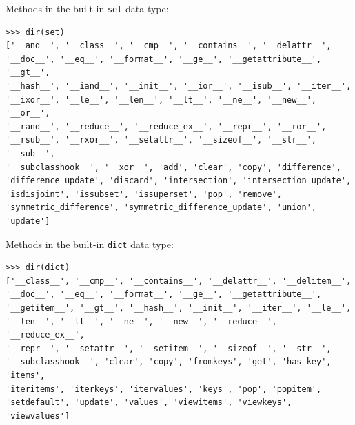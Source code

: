 \documentclass[8pt,a4paper,compress,handout]{beamer}
\begin{document}
\begin{frame}[fragile]
Methods in the built-in \lstinline{set} data type:
\begin{lstlisting}[language={}]
>>> dir(set)
['__and__', '__class__', '__cmp__', '__contains__', '__delattr__', 
'__doc__', '__eq__', '__format__', '__ge__', '__getattribute__', '__gt__', 
'__hash__', '__iand__', '__init__', '__ior__', '__isub__', '__iter__', 
'__ixor__', '__le__', '__len__', '__lt__', '__ne__', '__new__', '__or__', 
'__rand__', '__reduce__', '__reduce_ex__', '__repr__', '__ror__', 
'__rsub__', '__rxor__', '__setattr__', '__sizeof__', '__str__', '__sub__', 
'__subclasshook__', '__xor__', 'add', 'clear', 'copy', 'difference', 
'difference_update', 'discard', 'intersection', 'intersection_update', 
'isdisjoint', 'issubset', 'issuperset', 'pop', 'remove', 
'symmetric_difference', 'symmetric_difference_update', 'union', 'update']
\end{lstlisting}

\bigskip

Methods in the built-in \lstinline{dict} data type:
\begin{lstlisting}[language={}]
>>> dir(dict)
['__class__', '__cmp__', '__contains__', '__delattr__', '__delitem__', 
'__doc__', '__eq__', '__format__', '__ge__', '__getattribute__', 
'__getitem__', '__gt__', '__hash__', '__init__', '__iter__', '__le__', 
'__len__', '__lt__', '__ne__', '__new__', '__reduce__', '__reduce_ex__', 
'__repr__', '__setattr__', '__setitem__', '__sizeof__', '__str__', 
'__subclasshook__', 'clear', 'copy', 'fromkeys', 'get', 'has_key', 'items', 
'iteritems', 'iterkeys', 'itervalues', 'keys', 'pop', 'popitem', 
'setdefault', 'update', 'values', 'viewitems', 'viewkeys', 'viewvalues']
\end{lstlisting}
\end{frame}
\end{document}
